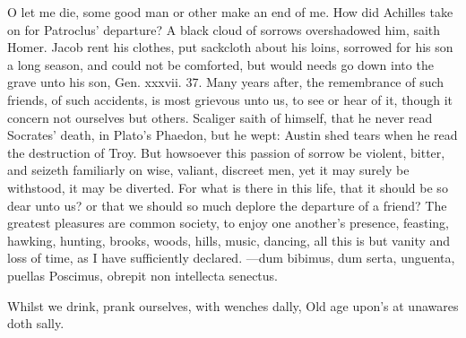 {O let me die, some good man or other make an end of me. How did
Achilles take on for Patroclus' departure? A black cloud of sorrows
overshadowed him, saith Homer. Jacob rent his clothes, put sackcloth
about his loins, sorrowed for his son a long season, and could not be
comforted, but would needs go down into the grave unto his son, Gen.
xxxvii. 37. Many years after, the remembrance of such friends, of such
accidents, is most grievous unto us, to see or hear of it, though it
concern not ourselves but others. Scaliger saith of himself, that he
never read Socrates' death, in Plato's Phaedon, but he wept:
Austin shed tears when he read the destruction of Troy. But
howsoever this passion of sorrow be violent, bitter, and seizeth
familiarly on wise, valiant, discreet men, yet it may surely be
withstood, it may be diverted. For what is there in this life, that it
should be so dear unto us? or that we should so much deplore the
departure of a friend? The greatest pleasures are common society, to
enjoy one another's presence, feasting, hawking, hunting, brooks,
woods, hills, music, dancing, \etc{} all this is but vanity and loss of
time, as I have sufficiently declared.
---dum bibimus, dum serta, unguenta, puellas
Poscimus, obrepit non intellecta senectus.

Whilst we drink, prank ourselves, with wenches dally,
Old age upon's at unawares doth sally.

}
